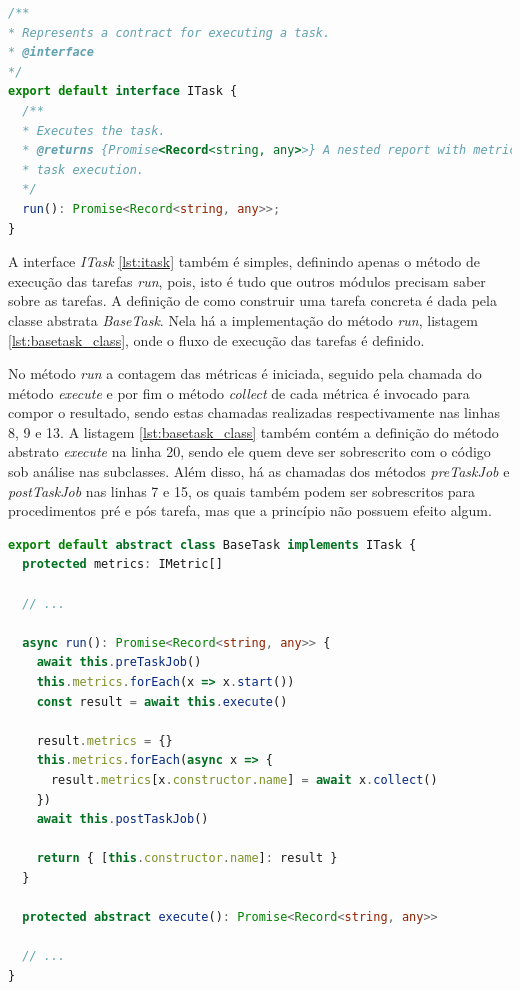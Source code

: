 \documentclass[12pt]{tcc}
\begin{document}
\begin{lstlisting}[label={lst:itask}, caption={Interface do módulo de tarefas.}, language=TypeScript, breaklines=true]
/**
* Represents a contract for executing a task.
* @interface
*/
export default interface ITask {
  /**
  * Executes the task.
  * @returns {Promise<Record<string, any>>} A nested report with metrics and metadata about the
  * task execution.
  */
  run(): Promise<Record<string, any>>;
}   
\end{lstlisting}

	A interface \emph{ITask} \ref{lst:itask} também é simples, definindo apenas o método de execução das tarefas \emph{run}, pois, isto é tudo que outros módulos precisam saber sobre as tarefas.
	A definição de como construir uma tarefa concreta é dada pela classe abstrata \emph{BaseTask}.
	Nela há a implementação do método \emph{run}, listagem \ref{lst:basetask_class}, onde o fluxo de execução das tarefas é definido.

	No método \emph{run} a contagem das métricas é iniciada, seguido pela chamada do método \emph{execute} e por fim o método \emph{collect} de cada métrica é invocado para compor o resultado, sendo estas chamadas realizadas respectivamente nas linhas 8, 9 e 13.
	A listagem \ref{lst:basetask_class} também contém a definição do método abstrato \emph{execute} na linha 20, sendo ele quem deve ser sobrescrito com o código sob análise nas subclasses.
	Além disso, há as chamadas dos métodos \emph{preTaskJob} e \emph{postTaskJob} nas linhas 7 e 15, os quais também podem ser sobrescritos para procedimentos pré e pós tarefa, mas que a princípio não possuem efeito algum.

\begin{lstlisting}[label={lst:basetask_class}, caption={[Fragmento de código da classe \emph{BaseTask}.]Fragmento de código da classe abstrata \emph{BaseTask}, implementação do método \emph{run} definido na interface \emph{ITask} \ref{lst:itask}.}, language=TypeScript, breaklines=true]
export default abstract class BaseTask implements ITask {
  protected metrics: IMetric[]

  // ...

  async run(): Promise<Record<string, any>> {
    await this.preTaskJob()
    this.metrics.forEach(x => x.start())
    const result = await this.execute()

    result.metrics = {}
    this.metrics.forEach(async x => {
      result.metrics[x.constructor.name] = await x.collect()
    })
    await this.postTaskJob()

    return { [this.constructor.name]: result }
  }

  protected abstract execute(): Promise<Record<string, any>>

  // ...
}
\end{lstlisting}
\end{document}

